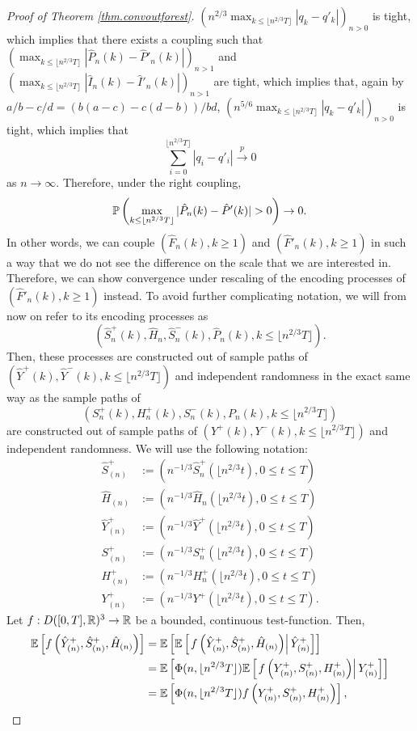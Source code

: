 \begin{proof}[Proof of Theorem \ref{thm.convoutforest}]
$\left(n^{2/3}\max_{k\leq \lfloor n^{2/3}T\rfloor }|q_k-q'_k|\right)_{n>0}$ is tight, which implies that there exists a coupling such that $\left(\max_{k\leq \lfloor n^{2/3}T\rfloor } |\hat{P}_n(k)-\hat{P}'_n(k)|\right)_{n>1}$ and $\left(\max_{k\leq \lfloor n^{2/3}T\rfloor } |\hat{I}_n(k)-\hat{I}'_n(k)|\right)_{n>1}$ are tight, which implies that, again by $a/b-c/d=(b(a-c)-c(d-b))/bd$, 
$\left(n^{5/6}\max_{k\leq \lfloor n^{2/3}T\rfloor }|q_k-q'_k|\right)_{n>0}$ is tight, which implies that 
$$\sum_{i=0}^{\lfloor n^{2/3}T\rfloor }|q_i-q'_i|\overset{p}{\to}0$$
as $n\to \infty$. 
Therefore, under the right coupling, 
$$\P\left(\max_{k\leq \lfloor n^{2/3} T \rfloor}|\hat{P}_n(k)-\hat{P}'(k)|>0\right)\to 0.$$
In other words, we can couple $(\hat{F}_n(k),k\geq 1)$ and $(\hat{F}'_n(k),k\geq 1)$ in such a way that we do not see the difference on the scale that we are interested in. Therefore, we can show convergence under rescaling of the encoding processes of $(\hat{F}'_n(k),k\geq 1)$ instead. To avoid further complicating notation, we will from now on refer to its encoding processes as $$(\hat{S}^{+}_n(k),\hat{H}_n, \hat{S}^-_n(k), \hat{P}_n(k),k\leq \lfloor n^{2/3}T\rfloor).$$ Then, these processes are constructed out of sample paths of $(\hat{Y}^+(k),\hat{Y}^-(k), k\leq \lfloor n^{2/3}T\rfloor )$ and independent randomness in the exact same way as the sample paths of $$({S}_n^{+}(k),{H}_n^+(k),{S}_n^-(k),P_n(k), k \leq \lfloor n^{2/3}T\rfloor )$$ are constructed out of sample paths of $(Y^+(k),Y^-(k), k\leq \lfloor n^{2/3}T\rfloor )$ and independent randomness. 
We will use the following notation:\begin{align*}
    \hat{S}^{+}_{(n)}&:=\left(n^{-1/3}\hat{S}^{+}_n\left(\lfloor n^{2/3} t \right),0\leq t \leq T\right)\\
    \hat{H}_{(n)}&:=\left(n^{-1/3}\hat{H}_n\left(\lfloor n^{2/3} t \right),0\leq t \leq T\right)\\
    \hat{Y}^+_{(n)}&:=\left(n^{-1/3}\hat{Y}^+\left(\lfloor n^{2/3} t \right),0\leq t \leq T\right)\\
     {S}^{+}_{(n)}&:=\left(n^{-1/3}{S}^{+}_n\left(\lfloor n^{2/3} t \right),0\leq t \leq T\right)\\
    {H}^+_{(n)}&:=\left(n^{-1/3}{H}^+_n\left(\lfloor n^{2/3} t \right),0\leq t \leq T\right)\\
    {Y}^+_{(n)}&:=\left(n^{-1/3}{Y}^+\left(\lfloor n^{2/3} t \right),0\leq t \leq T\right).
\end{align*}
Let $f:D([0,T],{\mathbb R})^3\to {\mathbb R}$ be a bounded, continuous test-function. Then,
\begin{align*}{\mathbb E}\left[f\left(\hat{Y}^+_{(n)}, \hat{S}^+_{(n)},  \hat{H}_{(n)}\right) \right]&= {\mathbb E}\left[ {\mathbb E}\left[\left. f\left(\hat{Y}^+_{(n)},\hat{S}^+_{(n)},  \hat{H}_{(n)}\right)\right|\hat{Y}^+_{(n)}\right]\right]\\&={\mathbb E}\left[ \Phi(n,\lfloor n^{2/3} T\rfloor){\mathbb E}\left[\left.f\left(Y^+_{(n)}, S^+_{(n)},  H^+_{(n)}\right)\right| {Y}^+_{(n)}\right]\right]\\&={\mathbb E}\left[ \Phi(n,\lfloor n^{2/3} T\rfloor)f\left(Y^+_{(n)},S^+_{(n)},  H^+_{(n)}\right)\right],\end{align*}

\end{proof}
